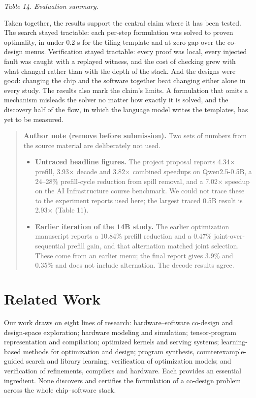 \documentclass[11pt]{article}
\providecommand{\tightlist}{\setlength{\itemsep}{0pt}\setlength{\parskip}{0pt}}
\begin{document}
\emph{Table 14. Evaluation summary.}

Taken together, the results support the central claim where it has been tested. The search stayed tractable: each per-step formulation was solved to proven optimality, in under 0.2 s for the tiling template and at zero gap over the co-design menus. Verification stayed tractable: every proof was local, every injected fault was caught with a replayed witness, and the cost of checking grew with what changed rather than with the depth of the stack. And the designs were good: changing the chip and the software together beat changing either alone in every study. The results also mark the claim's limits. A formulation that omits a mechanism misleads the solver no matter how exactly it is solved, and the discovery half of the flow, in which the language model writes the templates, has yet to be measured.

\begin{quote}
\textbf{Author note (remove before submission).} Two sets of numbers from the source material are deliberately not used.

\begin{itemize}
\tightlist
\item
  \textbf{Untraced headline figures.} The project proposal reports 4.34\ensuremath{\times} prefill, 3.93\ensuremath{\times} decode and 3.82\ensuremath{\times} combined speedups on Qwen2.5-0.5B, a 24--28\% prefill-cycle reduction from spill removal, and a 7.02\ensuremath{\times} speedup on the AI Infrastructure course benchmark. We could not trace these to the experiment reports used here; the largest traced 0.5B result is 2.93\ensuremath{\times} (Table 11).
\item
  \textbf{Earlier iteration of the 14B study.} The earlier optimization manuscript reports a 10.84\% prefill reduction and a 0.47\% joint-over-sequential prefill gain, and that alternation matched joint selection. These come from an earlier menu; the final report \cite{r98} gives 3.9\% and 0.35\% and does not include alternation. The decode results agree.
\end{itemize}
\end{quote}

\hypertarget{related-work}{%
\section{Related Work}\label{related-work}}

Our work draws on eight lines of research: hardware--software co-design and design-space exploration; hardware modeling and simulation; tensor-program representation and compilation; optimized kernels and serving systems; learning-based methods for optimization and design; program synthesis, counterexample-guided search and library learning; verification of optimization models; and verification of refinements, compilers and hardware. Each provides an essential ingredient. None discovers and certifies the formulation of a co-design problem across the whole chip--software stack.
\end{document}
